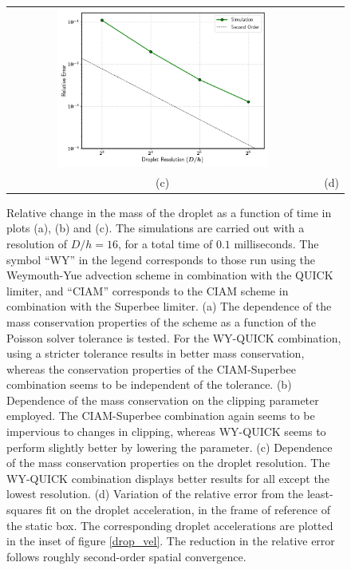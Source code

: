 \begin{figure}
\begin{center}
\begin{tabular}{cc}
\hspace{-0.2cm}%
\includegraphics[width=0.7\textwidth]{plots/raindrop/acc_conv.png} \\ 
\hspace{-0.2cm}%
(c) & (d)
\end{tabular}
\end{center}
\caption{Relative change in the mass of the droplet 
as a function of time in plots (a), (b) and (c). 
The simulations are carried out with a resolution of $D/h = 16$, 
for a total time of $0.1$ milliseconds. 
The symbol ``WY'' in the legend corresponds to those run using 
the Weymouth-Yue advection scheme in combination with the QUICK limiter, 
and ``CIAM'' corresponds to the CIAM scheme in combination with the Superbee limiter. 
(a) The dependence of the mass conservation properties of 
the scheme as a function of the Poisson solver tolerance is tested. 
For the WY-QUICK combination, using a stricter tolerance results 
in better mass conservation, whereas the conservation properties of the 
CIAM-Superbee combination seems to be independent of the tolerance.
(b) Dependence of the mass conservation on the clipping parameter employed. 
The CIAM-Superbee combination again seems to be impervious to changes in clipping, 
whereas WY-QUICK seems to perform slightly better by lowering the parameter.
(c) Dependence of the mass conservation properties on the droplet resolution. 
The WY-QUICK combination displays better results for all except the lowest resolution.   
(d) Variation of the relative error from the least-squares fit on the droplet acceleration, 
in the frame of reference of the static box. 
The corresponding droplet accelerations are plotted in the inset of figure \ref{drop_vel}. 
The reduction in the relative error follows roughly second-order spatial convergence.}
\label{mass_conv}
\end{figure}

